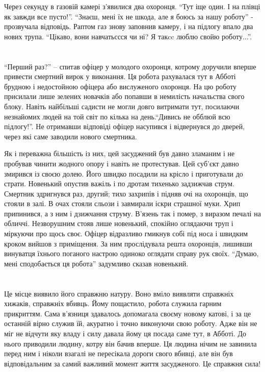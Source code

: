 \documentclass[a4paper,oneside]{book}
\begin{document}
Через секунду в газовій камері з’явилися два охоронця. “Тут іще один. І на
плівці як завжди все пусто!”. “Знаєш, мені їх не шкода, але я боюсь за нашу
роботу” - прозвучала відповідь. Раптом газ знову заповнив камеру, і на підлогу
впало два нових трупа. “Цікаво, вони навчатьссся чи ні? Я такcc люблю свойю
роботу...”.

\section*{} 

“Перший раз?” – спитав офіцер у молодого охоронця, котрому доручили вперше
привести смертний вирок у виконання. Ця робота рахувалася тут в Абботі брудною
і недостойною офіцера або вислуженого охоронця. На цю роботу присилали лише
зелених новачків або попавши в немилість начальства свого блоку. Навіть
найбільші садисти не могли довго витримати тут, посилаючи незнайомих людей на
той світ по кілька на день.“Дивись не обблюй всю підлогу!”. Не отримавши
відповіді офіцер насупився і відвернувся до дверей, через які саме заводили
нового смертника.

Як і переважна більшість із них, цей засуджений був давно зламаним і не
пробував чинити жодного опору і навіть не протестував. Цей суб’єкт давно
змирився із своєю долею. Його швидко посадили на крісло і приготували до
страти. Новенький опустив важіль і по дротам тихенько задзижчав
струм. Смертник здригнувся раз, другий; тихо захрипів і підняв очі на
охоронців, що стояли в залі. В очах стояли сльози і завмирали іскри страшної
муки. Хрип припинився, а з ним і дзижчання струму. В’язень так і помер, з
виразом печалі на обличчі. Незворушним стояв лише новенький, спокійно
оглядаючи труп і міркуючи про щось своє. Офіцер відразливо гмикнув собі під
носа і швидким кроком вийшов з приміщення. За ним прослідувала решта
охоронців, лишивши винуватця їхнього поганого настрою одиноко оглядати справу
рук своїх. “Думаю, мені сподобається ця робота” задумливо сказав новенький.

\section*{}
 
Це місце виявило його справжню натуру. Воно вміло виявляти справжніх хижаків,
справжніх вбивць. Йому пощастило, робота служила гарним прикриттям. Сама
в’язниця здавалось допомагала своєму новому катові, і за це останній вірно
служив їй, акуратно і точно виконуючи свою роботу. Адже він не міг не відчути
яку владу і силу давала йому ця посада саме тут, в Абботі. До нього приводили
людину, котру він бачив вперше. Ця людина нічим не завинила перед ним і ніколи
взагалі не пересікала дороги свого вбивці, але він був відповідальним за самий
важливий момент життя засудженого. Це справжня сила!
\end{document}

